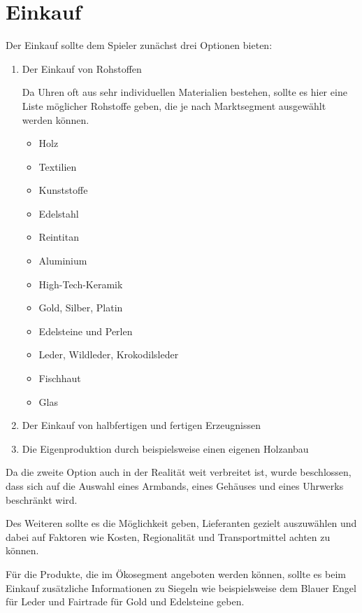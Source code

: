 \section{Einkauf}\label{sec:einkauf}
Der Einkauf sollte dem Spieler zunächst drei Optionen bieten:
\begin{enumerate}
\item Der Einkauf von Rohstoffen \par
Da Uhren oft aus sehr individuellen Materialien bestehen, sollte es hier eine Liste möglicher Rohstoffe geben, die je nach Marktsegment ausgewählt werden können.
\begin{itemize}
\item	Holz	\\
\item	Textilien	\\
\item	Kunststoffe	\\
\item	Edelstahl \\
\item	Reintitan \\
\item	Aluminium \\
\item	High-Tech-Keramik \\
\item	Gold, Silber, Platin
\item Edelsteine und Perlen \\
\item Leder, Wildleder, Krokodilsleder \\
\item	Fischhaut
\item	Glas \\
\end{itemize}
\item Der Einkauf von halbfertigen und fertigen Erzeugnissen \par

\item Die Eigenproduktion durch beispielsweise einen eigenen Holzanbau
\end{enumerate}

Da die zweite Option auch in der Realität weit verbreitet ist, wurde beschlossen, dass sich auf die Auswahl eines Armbands, eines Gehäuses und eines Uhrwerks beschränkt wird.

Des Weiteren sollte es die Möglichkeit geben, Lieferanten gezielt auszuwählen und dabei auf Faktoren wie Kosten, Regionalität und Transportmittel achten zu können.

Für die Produkte, die im Ökosegment angeboten werden können, sollte es beim Einkauf zusätzliche Informationen zu Siegeln wie beispielsweise dem Blauer Engel für Leder und Fairtrade für Gold und Edelsteine geben.